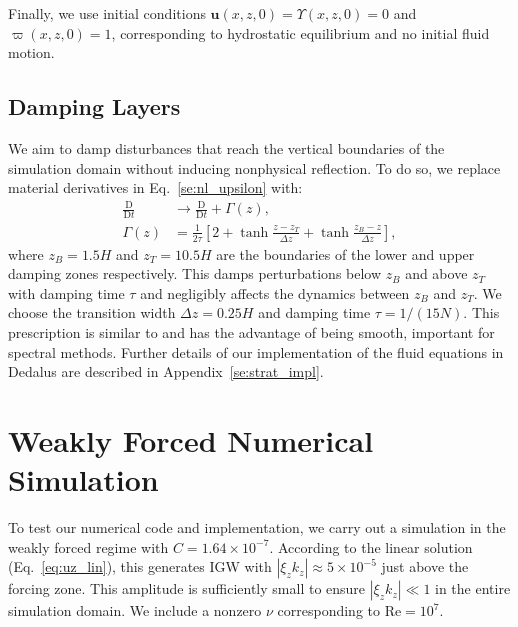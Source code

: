 \documentclass[
        fleqn,
        usenatbib,
        referee,
    ]{mnras}
\newcommand*{\scinot}[2]{#1\times10^{#2}}
\newcommand*{\md}[2]{\frac{\mathrm{D}#1}{\mathrm{D}#2}}
\newcommand*{\abs}[1]{\left|#1\right|}
\newcommand*{\s}[1]{\left[#1\right]}
\newcommand*{\bm}[1]{\mathbf{#1}}
\begin{document}
Finally, we use initial conditions $\bm{u}(x, z, 0) = \Upsilon(x, z, 0) = 0$ and
$\varpi(x, z, 0) = 1$, corresponding to hydrostatic equilibrium and no initial
fluid motion.

\subsection{Damping Layers}\label{ss:damping}

We aim to damp disturbances that reach the vertical boundaries of the simulation
domain without inducing nonphysical reflection. To do so, we replace material
derivatives in Eq.~\eqref{se:nl_upsilon} with:
\begin{align}
    \md{}{t} &\to \md{}{t} + \Gamma(z),\\
    \Gamma(z) &= \frac{1}{2\tau}\s{2 + \tanh \frac{z - z_T}{\Delta z}
        + \tanh \frac{z_B - z}{\Delta z}},\label{eq:Gamma}
\end{align}
where $z_B = 1.5H$ and $z_T = 10.5H$ are the boundaries of the lower and upper
damping zones respectively. This damps perturbations below $z_B$ and
above $z_T$ with damping time $\tau$ and negligibly affects the dynamics between
$z_B$ and $z_T$. We choose the transition width $\Delta z = 0.25H$ and damping
time $\tau = 1 / (15N)$. This prescription is similar to \citet{lecoanet_damp}
and has the advantage of being smooth, important for spectral methods. Further
details of our implementation of the fluid equations in Dedalus are described in
Appendix~\ref{se:strat_impl}.

\section{Weakly Forced Numerical Simulation}\label{s:weak_sim}

To test our numerical code and implementation, we carry out a simulation in the
weakly forced regime with $C = \scinot{1.64}{-7}$. According to the linear
solution (Eq.~\eqref{eq:uz_lin}), this generates IGW with $\abs{\xi_z k_z}
\approx \scinot{5}{-5}$ just above the forcing zone. This amplitude is
sufficiently small to ensure $\abs{\xi_z k_z} \ll 1$ in the entire simulation
domain. We include a nonzero $\nu$ corresponding to $\mathrm{Re} = 10^7$.
\end{document}
